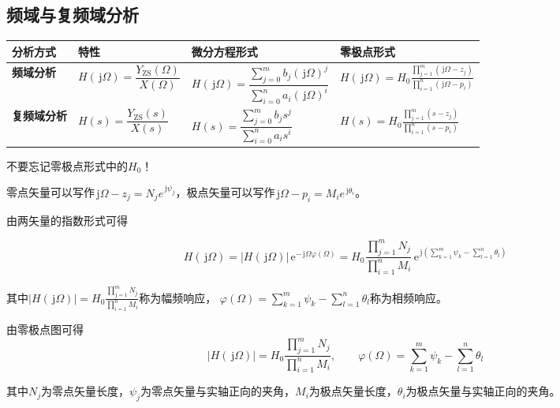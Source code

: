 \documentclass[UTF8,fontset=fandol,zihao=5]{ctexart}
\newcommand{\jj}{\,\mathrm{j}}
\newcommand{\ee}{\,\mathrm{e}}
\begin{document}
\subsection{频域与复频域分析}
\begin{center}
\begin{tabularx}{0.98\textwidth}{>{\bfseries}p{2cm}X X X}
\toprule
分析方式 & 特性 & 微分方程形式 & 零极点形式 \\
\midrule
频域分析 & 
$H(\jj \varOmega) = \dfrac{Y_\mathrm{ZS}(\varOmega)}{X(\varOmega)}$ & 
$H(\jj \varOmega) = \dfrac{\displaystyle\sum_{j=0}^{m}b_j\left(\jj \varOmega\right)^j}{\displaystyle\sum_{i=0}^{n}a_i\left(\jj \varOmega\right)^i}$ &
$H(\jj \varOmega)=H_0\frac{\displaystyle\prod_{j=1}^{m}(\jj \varOmega-z_j)}{\displaystyle\prod_{i=1}^{n}(\jj \varOmega-p_i)}$ \\
复频域分析 & 
$H(s) = \dfrac{Y_\mathrm{ZS}(s)}{X(s)}$ & 
$H(s) = \dfrac{\displaystyle\sum_{j=0}^{m}b_j s^j}{\displaystyle\sum_{i=0}^{n}a_i s^i}$ &
$H(s)=H_0\frac{\displaystyle\prod_{j=1}^{m}(s-z_j)}{\displaystyle\prod_{i=1}^{n}(s-p_i)}$ \\
\bottomrule
\end{tabularx}
\end{center}

\begin{methodbox}[【注意】]
  不要忘记零极点形式中的$H_0$！
\end{methodbox}

\begin{methodbox}[频域分析的其他零极点形式]
  零点矢量可以写作$\jj\varOmega-z_j=N_j e^{\jj\psi_j}$，极点矢量可以写作$\jj\varOmega-p_i=M_i e^{\jj\theta_i}$。
  
  由两矢量的指数形式可得
  
  \[
  H(\jj\varOmega) = \left|H(\jj\varOmega)\right|\ee^{-\jj\varOmega\varphi(\varOmega)} = H_0\frac{\displaystyle\prod_{j=1}^{m}N_j}{\displaystyle\prod_{i=1}^{n}M_i}\ee^{\displaystyle\jj\left(\displaystyle\sum_{k=1}^{m}\psi_k-\displaystyle\sum_{l=1}^{n}\theta_{l}\right)}
  \]

  其中$\left|H(\jj\varOmega)\right|= H_0\frac{\displaystyle\prod_{j=1}^{m}N_j}{\displaystyle\prod_{i=1}^{n}M_i}$称为幅频响应，
  $\displaystyle\varphi(\varOmega)=\displaystyle\sum_{k=1}^{m}\psi_k-\displaystyle\sum_{l=1}^{n}\theta_{l}$称为相频响应。
\end{methodbox}

\begin{methodbox}[由零极点图求幅频响应与相频响应]
  由零极点图可得
  \[
  \left|H(\jj\varOmega)\right|= H_0\frac{\displaystyle\prod_{j=1}^{m}N_j}{\displaystyle\prod_{i=1}^{n}M_i}
  ,\qquad
  \varphi(\varOmega)=\displaystyle\sum_{k=1}^{m}\psi_k-\displaystyle\sum_{l=1}^{n}\theta_{l}
  \]

  其中$N_j$为零点矢量长度，$\psi_j$为零点矢量与实轴正向的夹角，$M_i$为极点矢量长度，$\theta_i$为极点矢量与实轴正向的夹角。
  
\end{methodbox}
\end{document}
